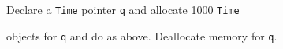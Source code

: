 Declare a \texttt{Time} pointer \texttt{q} and allocate 1000 \texttt{Time}

objects for \texttt{q} and do as above. Deallocate memory for \texttt{q}.

